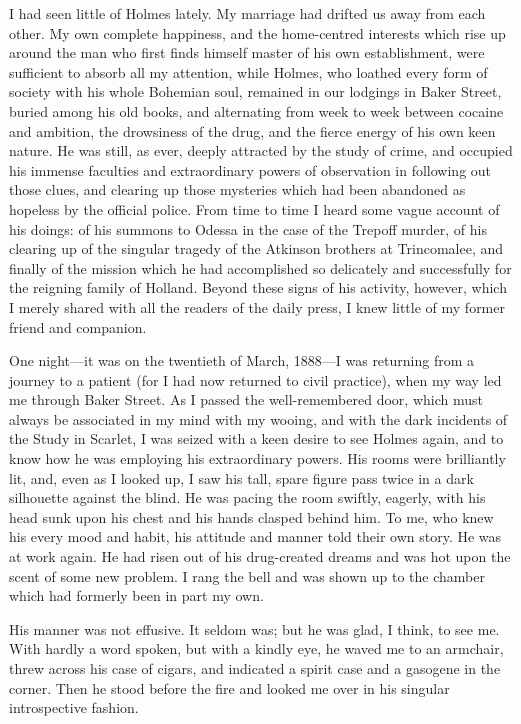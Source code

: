 I had seen little of Holmes lately. My marriage had drifted us away from each other. My own complete happiness, and the home-centred interests which rise up around the man who first finds himself master of his own establishment, were sufficient to absorb all my attention, while Holmes, who loathed every form of society with his whole Bohemian soul, remained in our lodgings in Baker Street, buried among his old books, and alternating from week to week between cocaine and ambition, the drowsiness of the drug, and the fierce energy of his own keen nature. He was still, as ever, deeply attracted by the study of crime, and occupied his immense faculties and extraordinary powers of observation in following out those clues, and clearing up those mysteries which had been abandoned as hopeless by the official police. From time to time I heard some vague account of his doings: of his summons to Odessa in the case of the Trepoff murder, of his clearing up of the singular tragedy of the Atkinson brothers at Trincomalee, and finally of the mission which he had accomplished so delicately and successfully for the reigning family of Holland. Beyond these signs of his activity, however, which I merely shared with all the readers of the daily press, I knew little of my former friend and companion.

One night—it was on the twentieth of March, 1888—I was returning from a journey to a patient (for I had now returned to civil practice), when my way led me through Baker Street. As I passed the well-remembered door, which must always be associated in my mind with my wooing, and with the dark incidents of the Study in Scarlet, I was seized with a keen desire to see Holmes again, and to know how he was employing his extraordinary powers. His rooms were brilliantly lit, and, even as I looked up, I saw his tall, spare figure pass twice in a dark silhouette against the blind. He was pacing the room swiftly, eagerly, with his head sunk upon his chest and his hands clasped behind him. To me, who knew his every mood and habit, his attitude and manner told their own story. He was at work again. He had risen out of his drug-created dreams and was hot upon the scent of some new problem. I rang the bell and was shown up to the chamber which had formerly been in part my own.

His manner was not effusive. It seldom was; but he was glad, I think, to see me. With hardly a word spoken, but with a kindly eye, he waved me to an armchair, threw across his case of cigars, and indicated a spirit case and a gasogene in the corner. Then he stood before the fire and looked me over in his singular introspective fashion.

